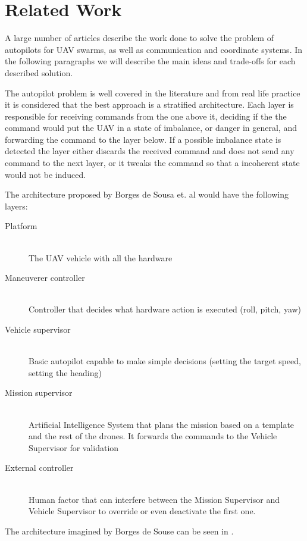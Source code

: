 \chapter{Related Work}
\label{chapter:related-work}

A large number of articles describe the work done to solve the problem of autopilots for
UAV swarms, as well as communication and coordinate systems. In the following paragraphs 
we will describe the main ideas and trade-offs for each described solution.

The autopilot problem is well covered in the literature and from real life practice
it is considered that the best approach is a stratified architecture. Each layer
is responsible for receiving commands from the one above it, deciding if the
the command would put the UAV in a state of imbalance, or danger in general, and
forwarding the command to the layer below. If a possible imbalance state is detected
the layer either discards the received command and does not send any command to 
the next layer, or it tweaks the command so that a incoherent state would not
be induced.

The architecture proposed by Borges de Sousa et. al \cite{pivant} would have
the following layers:

\begin{description}
\item[Platform] \hfill \\ The UAV vehicle with all the hardware
\item[Maneuverer controller] \hfill \\ Controller that decides what hardware action is 
executed (roll, pitch, yaw)
\item[Vehicle supervisor] \hfill \\ Basic autopilot capable to make simple decisions 
(setting the target speed, setting the heading)
\item[Mission supervisor] \hfill \\ Artificial Intelligence System that plans the mission
based on a template and the rest of the drones. It forwards the commands to the
Vehicle Supervisor for validation
\item[External controller] \hfill \\ Human factor that can interfere between the Mission
Supervisor and Vehicle Supervisor to override or even deactivate the first one.
\end{description}

The architecture imagined by Borges de Souse can be seen in .

